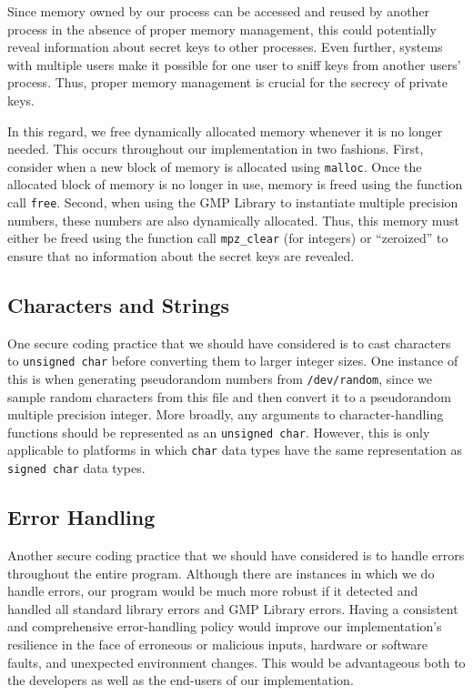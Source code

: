 \documentclass[letterpaper]{article}
\begin{document}
Since memory owned by our process can be accessed and reused by another process in the absence of proper memory management, this could potentially reveal information about secret keys to other processes. Even further, systems with multiple users make it possible for one user to sniff keys from another users' process. Thus, proper memory management is crucial for the secrecy of private keys.

In this regard, we free dynamically allocated memory whenever it is no longer needed. This occurs throughout our implementation in two fashions. First, consider when a new block of memory is allocated using {\tt malloc}. Once the allocated block of memory is no longer in use, memory is freed using the function call {\tt free}. Second, when using the GMP Library to instantiate multiple precision numbers, these numbers are also dynamically allocated. Thus, this memory must
either be freed using the function call {\tt mpz\_clear} (for integers) or ``zeroized'' to ensure that no information about the secret keys are revealed.

\subsection{Characters and Strings}

One secure coding practice that we should have considered is to cast characters to {\tt unsigned char} before converting them to larger integer sizes. One instance of this is when generating pseudorandom numbers from {\tt /dev/random}, since we sample random characters from this file and then convert it to a pseudorandom multiple precision integer. More broadly, any arguments to character-handling functions should be represented as an {\tt unsigned char}.
However, this is only applicable to platforms in which {\tt char} data types have the same representation as {\tt signed char} data types.

\subsection{Error Handling}

Another secure coding practice that we should have considered is to handle errors throughout the entire program. Although there are instances in which we do handle errors, our program would be much more robust if it detected and handled all standard library errors and GMP Library errors. Having a consistent and comprehensive error-handling policy would improve our implementation's resilience in the face of erroneous or malicious inputs, hardware or software faults, and
unexpected environment changes. This would be advantageous both to the developers as well as the end-users of our implementation.
\end{document}
